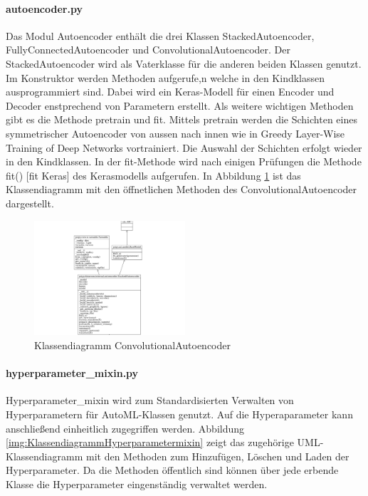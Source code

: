 	\paragraph{autoencoder.py} Das Modul Autoencoder enthält die drei Klassen StackedAutoencoder, FullyConnectedAutoencoder und ConvolutionalAutoencoder. Der StackedAutoencoder wird als Vaterklasse für die anderen beiden Klassen genutzt. Im Konstruktor werden Methoden aufgerufe,n welche in den Kindklassen ausprogrammiert sind. Dabei wird ein Keras-Modell für einen Encoder und Decoder enstprechend von Parametern  erstellt. Als weitere wichtigen Methoden gibt es die Methode pretrain und fit. Mittels pretrain werden die Schichten eines symmetrischer Autoencoder von aussen nach innen wie in 	 Greedy Layer-Wise Training of Deep Networks  vortrainiert. Die Auswahl der Schichten erfolgt wieder in den Kindklassen.
	In der fit-Methode wird nach einigen Prüfungen die Methode fit() 		[fit Keras] des Kerasmodells aufgerufen. In Abbildung \ref{img:KlassendiagrammConvolutionalAutoencoder} ist das Klassendiagramm mit den öffnetlichen Methoden des ConvolutionalAutoencoder dargestellt. 
	\begin{figure}[h]
		\centering
		\includegraphics[width=0.5\textwidth, center]{bilder/Klassendiagramme/klassendiagramm_public_cae.png}
		\caption[Klassendiagramm ConvolutionalAutoencoder]{Klassendiagramm ConvolutionalAutoencoder}
		\label{img:KlassendiagrammConvolutionalAutoencoder}
	\end{figure}  
	
	\paragraph{hyperparameter\_mixin.py}  Hyperparameter\_mixin wird zum Standardisierten Verwalten von Hyperparametern für AutoML-Klassen genutzt. Auf die Hyperaparameter kann anschließend einheitlich zugegriffen werden. Abbildung \ref{img:KlassendiagrammHyperparametermixin}  zeigt das zugehörige UML-Klassendiagramm mit den Methoden zum Hinzufügen, Löschen und Laden der Hyperparameter. Da die Methoden öffentlich sind können über jede erbende Klasse die Hyperparameter eingenständig verwaltet werden.
	
